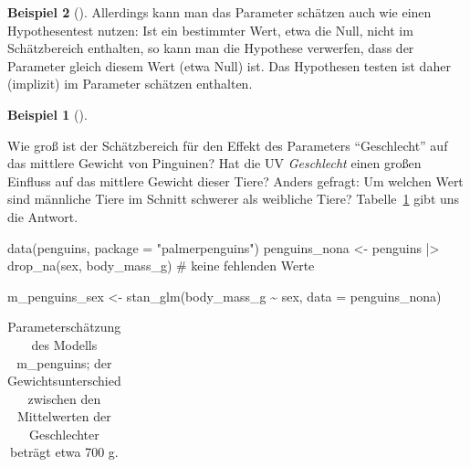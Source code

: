 \documentclass[
  ngerman,
  letterpaper,
  twoside,
  open=any]{scrbook}
\newenvironment{Shaded}{\begin{snugshade}}{\end{snugshade}}
\newcommand{\AttributeTok}[1]{\textcolor[rgb]{0.40,0.45,0.13}{#1}}
\newcommand{\CommentTok}[1]{\textcolor[rgb]{0.37,0.37,0.37}{#1}}
\newcommand{\FunctionTok}[1]{\textcolor[rgb]{0.28,0.35,0.67}{#1}}
\newcommand{\NormalTok}[1]{\textcolor[rgb]{0.00,0.23,0.31}{#1}}
\newcommand{\OtherTok}[1]{\textcolor[rgb]{0.00,0.23,0.31}{#1}}
\newcommand{\SpecialCharTok}[1]{\textcolor[rgb]{0.37,0.37,0.37}{#1}}
\newcommand{\StringTok}[1]{\textcolor[rgb]{0.13,0.47,0.30}{#1}}
\theoremstyle{definition}
\newtheorem{example}{Beispiel}[chapter]
\theoremstyle{plain}
\theoremstyle{definition}
\theoremstyle{definition}
\theoremstyle{remark}
\begin{document}
\begin{example}[]
Allerdings kann man das Parameter schätzen auch wie einen Hypothesentest
nutzen: Ist ein bestimmter Wert, etwa die Null, nicht im Schätzbereich
enthalten, so kann man die Hypothese verwerfen, dass der Parameter
gleich diesem Wert (etwa Null) ist. Das Hypothesen testen ist daher
(implizit) im Parameter schätzen enthalten.

\begin{example}[]\protect\hypertarget{exm-pinguins}{}\label{exm-pinguins}

Wie groß ist der Schätzbereich für den Effekt des Parameters
\enquote{Geschlecht} auf das mittlere Gewicht von Pinguinen? Hat die UV
\emph{Geschlecht} einen großen Einfluss auf das mittlere Gewicht dieser
Tiere? Anders gefragt: Um welchen Wert sind männliche Tiere im Schnitt
schwerer als weibliche Tiere? Tabelle~\ref{tbl-m-penguins-sex-params}
gibt uns die Antwort.

\begin{Shaded}
\begin{Highlighting}[]
\FunctionTok{data}\NormalTok{(penguins, }\AttributeTok{package =} \StringTok{"palmerpenguins"}\NormalTok{)}
\NormalTok{penguins\_nona }\OtherTok{\textless{}{-}}
\NormalTok{  penguins }\SpecialCharTok{|\textgreater{}} \FunctionTok{drop\_na}\NormalTok{(sex, body\_mass\_g)  }\CommentTok{\# keine fehlenden Werte}

\NormalTok{m\_penguins\_sex }\OtherTok{\textless{}{-}} 
  \FunctionTok{stan\_glm}\NormalTok{(body\_mass\_g }\SpecialCharTok{\textasciitilde{}}\NormalTok{ sex, }\AttributeTok{data =}\NormalTok{ penguins\_nona)}
\end{Highlighting}
\end{Shaded}

{

\begin{longtable}[]{@{}
  >{\raggedright\arraybackslash}p{}
  >{\centering\arraybackslash}p{}
  >{\centering\arraybackslash}p{}
  >{\centering\arraybackslash}p{}
  >{\centering\arraybackslash}p{}
  >{\centering\arraybackslash}p{}
  >{\centering\arraybackslash}p{}@{}}

\caption{\label{tbl-m-penguins-sex-params}Parameterschätzung des Modells
m\_penguins; der Gewichtsunterschied zwischen den Mittelwerten der
Geschlechter beträgt etwa 700 g.}


\end{longtable}}
\end{example}
\end{example}
\end{document}
